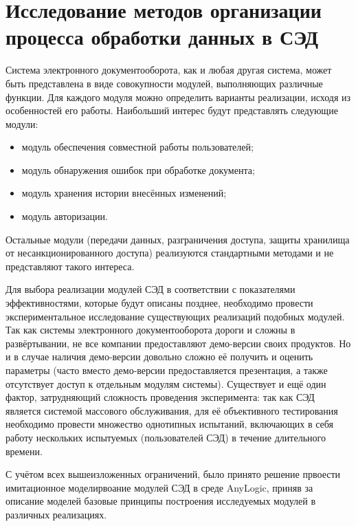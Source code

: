 \section{Исследование методов организации процесса обработки данных в СЭД} \label{experiment}

Система электронного документооборота, как и любая другая система, может быть представлена в виде совокупности модулей, выполняющих различные функции. %
Для каждого модуля можно определить варианты реализации, исходя из особенностей его работы. Наибольший интерес будут представлять следующие модули:
\begin{itemize}
	\item модуль обеспечения совместной работы пользователей;
	\item модуль обнаружения ошибок при обработке документа;
	\item модуль хранения истории внесённых изменений;
	\item модуль авторизации.
\end{itemize}
Остальные модули (передачи данных, разграничения доступа, защиты хранилища от несанкционированного доступа) реализуются стандартными методами и не представляют такого интереса.

\vspace{\baselineskip}
Для выбора реализации модулей СЭД в соответствии с показателями эффективностями, которые будут описаны позднее, необходимо провести экспериментальное исследование существующих реализаций подобных модулей. Так как системы электронного документооборота дороги и сложны в развёртывании, не все компании предоставляют демо-версии своих продуктов. Но и в случае наличия демо-версии довольно сложно её получить и оценить параметры (часто вместо демо-версии предоставляется презентация, а также отсутствует доступ к отдельным модулям системы). Существует и ещё один фактор, затрудняющий сложность проведения эксперимента: так как СЭД является системой массового обслуживания, для её объективного тестирования необходимо провести множество однотипных испытаний, включающих в себя работу нескольких испытуемых (пользователей СЭД) в течение длительного времени.

\vspace{\baselineskip}
С учётом всех вышеизложенных ограничений, было принято решение првоести имитационное моделирвоание модулей СЭД в среде AnyLogic, приняв за описание моделей базовые принципы построения исследуемых модулей в различных реализациях.

